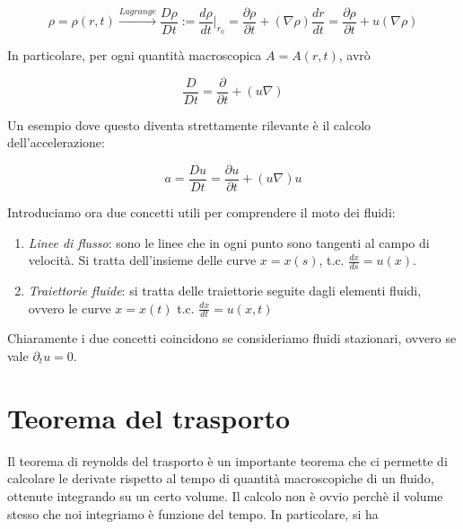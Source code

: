 \documentclass{report}
\begin{document}
\begin{equation}
    \rho = \rho(r, t) \xrightarrow{Lagrange} \frac{D\rho}{Dt} := \frac{d\rho}{dt}\biggr|_{r_0} = \frac{\partial \rho}{\partial t} + (\nabla \rho) \frac{dr}{dt} = \frac{\partial \rho}{\partial t} + u(\nabla \rho) 
\end{equation}

In particolare, per ogni quantità macroscopica $A = A(r, t)$, avrò

\begin{equation}
    \frac{D}{Dt} = \frac{\partial}{\partial t} + (u\nabla) 
\end{equation}

Un esempio dove questo diventa strettamente rilevante è il calcolo dell'accelerazione: 

\begin{equation}
    a = \frac{Du}{Dt} = \frac{\partial u}{\partial t} + (u\nabla)u
\end{equation}

Introduciamo ora due concetti utili per comprendere il moto dei fluidi: 
\begin{enumerate}
    \item
    \emph{Linee di flusso}: sono le linee che in ogni punto sono tangenti al campo di velocità. Si tratta dell'insieme delle curve $x=x(s)$, t.c. $\frac{dx}{ds} = u(x)$. 
    \item 
    \emph{Traiettorie fluide}: si tratta delle traiettorie seguite dagli elementi fluidi, ovvero le curve $x=x(t)$ t.c. $\frac{dx}{dt} = u(x, t)$
\end{enumerate}

Chiaramente i due concetti coincidono se consideriamo fluidi stazionari, ovvero se vale $\partial_tu=0$. 

\section{Teorema del trasporto}

Il teorema di reynolds del trasporto è un importante teorema che ci permette di calcolare le derivate rispetto al tempo di quantità macroscopiche di un fluido, ottenute integrando su un certo volume. Il calcolo non è ovvio perchè il volume stesso che noi integriamo è funzione del tempo. In particolare, si ha 

\end{document}
